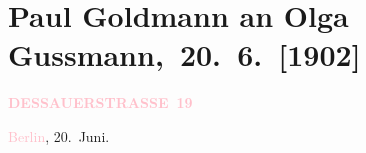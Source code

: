 

\renewcommand{\erwaehntePersonen}{Personen:  Albert von Sachsen, Paul Goldmann, Raphael Löwenfeld, Paul Marx, Olga Schnitzler, Elisabeth Steinrück}
\renewcommand{\erwaehnteInstitutionen}{Institutionen: Deutsches Theater Berlin}
\renewcommand{\erwaehnteOrte}{Orte: Berlin, Dessauer Straße, Dresden, Wien}
\renewcommand{\erwaehnteWerke}{}
\section[ Paul Goldmann an Olga Gussmann, 20. 6. {[}1902{]}]{Paul Goldmann an Olga Gussmann, 20. 6. {[}1902{]}}
\nopagebreak{}
\rehead{ }\normalsize\beginnumbering{}
\toendnotes[C]{\smallbreak\pagebreak[2]}
\toendnotes[C]{\smallbreak}
\pstart
           \noindent{}\raggedleft{}{\pb}\textcolor{gray}{\textbf{\textcolor{pink}{DESSAUERSTRASSE 19}{}\ledrightnote{\textcolor{pink}{Dessauer Straße}}}}\pend
           
\pstart
           \textcolor{pink}{Berlin}{}\ledrightnote{\textcolor{pink}{Berlin}}, 20. Juni.\pend
           
